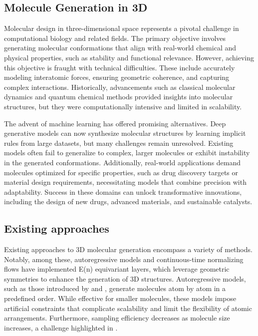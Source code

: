 \documentclass[sigconf]{acmart}
\begin{document}
\subsection{Molecule Generation in 3D}
Molecular design in three-dimensional space represents a pivotal challenge in computational biology and related fields. The primary objective involves generating molecular conformations that align with real-world chemical and physical properties, such as stability and functional relevance. However, achieving this objective is fraught with technical difficulties. These include accurately modeling interatomic forces, ensuring geometric coherence, and capturing complex interactions. Historically, advancements such as classical molecular dynamics and quantum chemical methods provided insights into molecular structures, but they were computationally intensive and limited in scalability.

The advent of machine learning has offered promising alternatives. Deep generative models can now synthesize molecular structures by learning implicit rules from large datasets, but many challenges remain unresolved. Existing models often fail to generalize to complex, larger molecules or exhibit instability in the generated conformations. Additionally, real-world applications demand molecules optimized for specific properties, such as drug discovery targets or material design requirements, necessitating models that combine precision with adaptability. Success in these domains can unlock transformative innovations, including the design of new drugs, advanced materials, and sustainable catalysts.

\subsection{Existing approaches}
Existing approaches to 3D molecular generation encompass a variety of methods. Notably, among these, autoregressive models and continuous-time normalizing flows have implemented E(n) equivariant layers, which leverage geometric symmetries to enhance the generation of 3D structures. Autoregressive models, such as those introduced by \cite{gebauer2018generating} and \cite{gebauer2019symmetry}, generate molecules atom by atom in a predefined order. While effective for smaller molecules, these models impose artificial constraints that complicate scalability and limit the flexibility of atomic arrangements. Furthermore, sampling efficiency decreases as molecule size increases, a challenge highlighted in \cite{xu2021anytime}.
\end{document}
